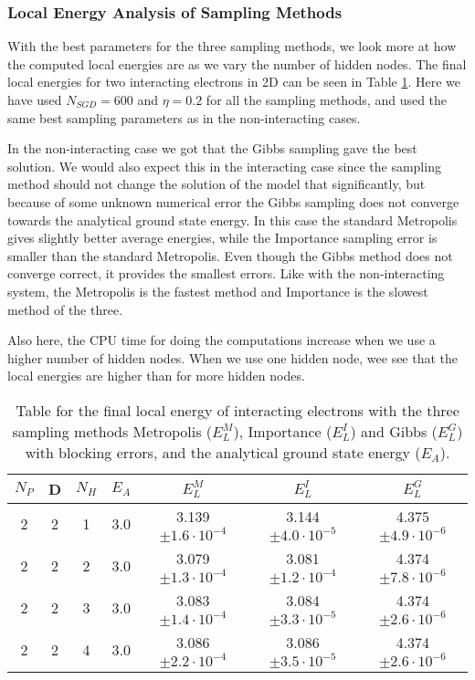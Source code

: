 \documentclass[12pt,a4paper,english]{article}
\begin{document}
\subsubsection{Local Energy Analysis of Sampling Methods}
\label{subsubsect:Results_int_Analysis}
With the best parameters for the three sampling methods, we look more at how the computed local energies are as we vary the number of hidden nodes. The final local energies for two interacting electrons in 2D can be seen in Table \ref{tab:Int_energies}. Here we have used $N_{SGD}=600$ and $\eta=0.2$ for all the sampling methods, and used the same best sampling parameters as in the non-interacting cases.

In the non-interacting case we got that the Gibbs sampling gave the best solution. We would also expect this in the interacting case since the sampling method should not change the solution of the model that significantly, but because of some unknown numerical error the Gibbs sampling does not converge towards the analytical ground state energy. In this case the standard Metropolis gives slightly better average energies, while the Importance sampling error is smaller than the standard Metropolis. Even though the Gibbs method does not converge correct, it provides the smallest errors. Like with the non-interacting system, the Metropolis is the fastest method and Importance is the slowest method of the three.

Also here, the CPU time for doing the computations increase when we use a higher number of hidden nodes. When we use one hidden node, wee see that the local energies are higher than for more hidden nodes.

\begin{table}[htbp!]
	\centering
	\begin{tabular}{ |c|c|c|c|c|c|c| }
		\hline \rule{0pt}{13pt}
		$N_P$ & D & $N_H$ & $E_A$ & $E_L^M$ & $E_L^I$ & $E_L^G$ \\
		\hline \rule{0pt}{13pt}%
		2 & 2 & 1 & 3.0 & 3.139$\pm1.6\cdot10^{-4}$ & 3.144$\pm4.0\cdot10^{-5}$ & 4.375$\pm4.9\cdot10^{-6}$ \\
		2 & 2 & 2 & 3.0 & 3.079$\pm1.3\cdot10^{-4}$ & 3.081$\pm1.2\cdot10^{-4}$ & 4.374$\pm7.8\cdot10^{-6}$ \\
		2 & 2 & 3 & 3.0 & 3.083$\pm1.4\cdot10^{-4}$ & 3.084$\pm3.3\cdot10^{-5}$ & 4.374$\pm2.6\cdot10^{-6}$ \\
		2 & 2 & 4 & 3.0 & 3.086$\pm2.2\cdot10^{-4}$ & 3.086$\pm3.5\cdot10^{-5}$ & 4.374$\pm2.6\cdot10^{-6}$ \\
		\hline
	\end{tabular}	
	\caption{Table for the final local energy of interacting electrons with the three sampling methods Metropolis ($E_L^M$), Importance ($E_L^I$) and Gibbs ($E_L^G$) with blocking errors, and the analytical ground state energy ($E_A$). \label{tab:Int_energies}}
\end{table}
\end{document}
